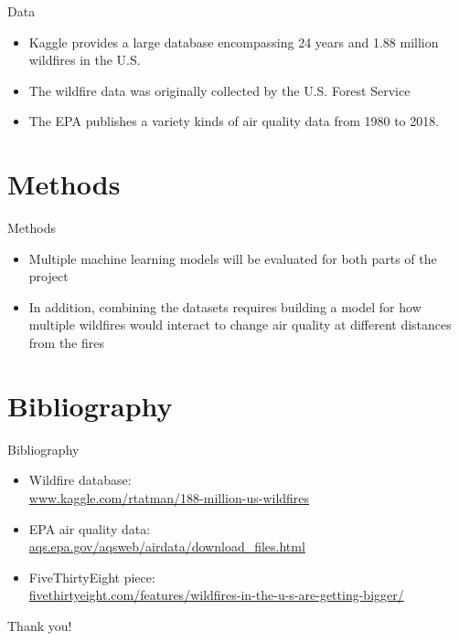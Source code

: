 \documentclass{beamer}
\begin{document}
\begin{frame}{Data}
\begin{itemize}
\item Kaggle provides a large database encompassing 24 years and 1.88 million wildfires in the U.S.
\item The wildfire data was originally collected by the U.S. Forest Service
\item The EPA publishes a variety kinds of air quality data from 1980 to 2018. 
\end{itemize}
\end{frame}

\section{Methods}

\begin{frame}{Methods}
\begin{itemize}
\item Multiple machine learning models will be evaluated for both parts of the project
\item In addition, combining the datasets requires building a model for how multiple wildfires would interact to change air quality at different distances from the fires
\end{itemize}
\end{frame}

\section{Bibliography}

\begin{frame}{Bibliography}
\begin{itemize}
\item Wildfire database: \\ \url{www.kaggle.com/rtatman/188-million-us-wildfires}
\item EPA air quality data: \\ \url{aqs.epa.gov/aqsweb/airdata/download_files.html}
\item FiveThirtyEight piece: \\ \url{fivethirtyeight.com/features/wildfires-in-the-u-s-are-getting-bigger/}
\end{itemize}
\end{frame}

\begin{frame}[plain]
\begin{center}
\LARGE Thank you!
\end{center}
\end{frame}
\end{document}
